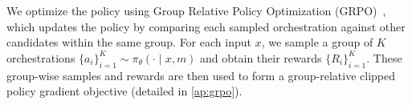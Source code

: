 We optimize the policy using Group Relative Policy
Optimization (GRPO)~\citep{shao2024deepseekmath}, which updates the policy by
comparing each sampled orchestration against other candidates within the same
group. For each input $x$, we sample a group of $K$ orchestrations
$\{a_i\}_{i=1}^K \sim \pi_\theta(\cdot \mid x, m)$ and obtain their rewards
$\{R_i\}_{i=1}^K$. These group-wise samples and rewards are then used to form a group-relative clipped policy gradient objective (detailed in \cref{ap:grpo}).
